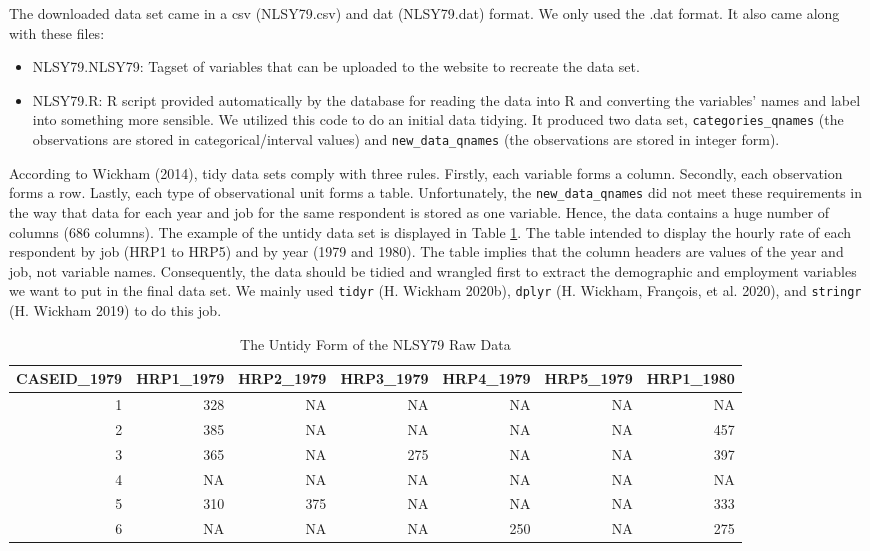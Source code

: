 \documentclass{article}
\begin{document}
The downloaded data set came in a csv (NLSY79.csv) and dat (NLSY79.dat) format. We only used the .dat format. It also came along with these files:

\begin{itemize}
\tightlist
\item
  NLSY79.NLSY79: Tagset of variables that can be uploaded to the website to recreate the data set.
\item
  NLSY79.R: R script provided automatically by the database for reading the data into R and converting the variables' names and label into something more sensible. We utilized this code to do an initial data tidying. It produced two data set, \texttt{categories\_qnames} (the observations are stored in categorical/interval values) and \texttt{new\_data\_qnames} (the observations are stored in integer form).
\end{itemize}

According to Wickham (2014), tidy data sets comply with three rules. Firstly, each variable forms a column. Secondly, each observation forms a row. Lastly, each type of observational unit forms a table. Unfortunately, the \texttt{new\_data\_qnames} did not meet these requirements in the way that data for each year and job for the same respondent is stored as one variable. Hence, the data contains a huge number of columns (686 columns). The example of the untidy data set is displayed in Table \ref{tab:untidy-data}. The table intended to display the hourly rate of each respondent by job (HRP1 to HRP5) and by year (1979 and 1980). The table implies that the column headers are values of the year and job, not variable names. Consequently, the data should be tidied and wrangled first to extract the demographic and employment variables we want to put in the final data set. We mainly used \texttt{tidyr} (H. Wickham 2020b), \texttt{dplyr} (H. Wickham, François, et al. 2020), and \texttt{stringr} (H. Wickham 2019) to do this job.

\begin{table}

\caption{\label{tab:untidy-data}The Untidy Form of the NLSY79 Raw Data}
\centering
\begin{tabular}[t]{r|r|r|r|r|r|r}
\hline
CASEID\_1979 & HRP1\_1979 & HRP2\_1979 & HRP3\_1979 & HRP4\_1979 & HRP5\_1979 & HRP1\_1980\\
\hline
1 & 328 & NA & NA & NA & NA & NA\\
\hline
2 & 385 & NA & NA & NA & NA & 457\\
\hline
3 & 365 & NA & 275 & NA & NA & 397\\
\hline
4 & NA & NA & NA & NA & NA & NA\\
\hline
5 & 310 & 375 & NA & NA & NA & 333\\
\hline
6 & NA & NA & NA & 250 & NA & 275\\
\hline
\end{tabular}
\end{table}
\end{document}
